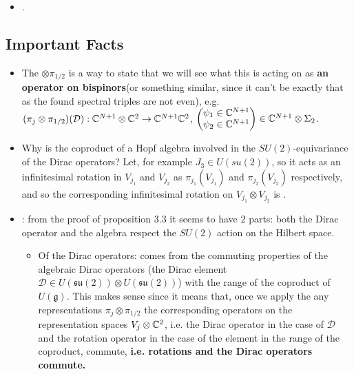 \documentclass{article}
\newcommand{\alg}[1]{\ensuremath{\mathfrak{#1}}}
\newcommand{\sut}{\ensuremath{\mathfrak{su}(2)}}
\begin{document}
\begin{itemize}
\begin{itemize}
        \item {}.
            
        \end{itemize}
    
    
    \end{itemize}

\subsection{Important Facts}

    \begin{itemize}

    \item The $\otimes \pi_{1/2}$ is a way to state that we will see what this is acting on as \textbf{an operator on bispinors}(or something similar, since it can't be exactly that as the found spectral triples are not even), e.g. $(\pi_j \otimes \pi_{1/2})(\mathcal D): \mathbb{C}^{N+1}\otimes \mathbb{C}^2 \to \mathbb{C}^{N+1}\mathbb{C}^2$, $\begin{pmatrix} \psi_1 \in \mathbb{C}^{N+1} \\ \psi_2 \in \mathbb{C}^{N+1} \end{pmatrix} \in \mathbb{C}^{N+1}\otimes \Sigma_2$.
    
    \item Why is the coproduct of a Hopf algebra involved in the $SU(2)$-equivariance of the Dirac operators? Let, for example $J_3 \in U(su(2))$, so it acts as an infinitesimal rotation in $V_{j_1}$ and $V_{j_2}$ as $\pi_{j_1}(V_{j_1})$ and $\pi_{j_2}(V_{j_2})$ respectively, and so the corresponding infinitesimal rotation on $V_{j_1}\otimes V_{j_2}$ is .
    
    \item {}: from the proof of proposition 3.3 it seems to have $2$ parts: both the Dirac operator and the algebra respect the $SU(2)$ action on the Hilbert space.
    
        \begin{itemize}
            
        \item Of the Dirac operators: comes from the commuting properties of the algebraic Dirac operators (the Dirac element $\mathcal D \in U(\sut) \otimes U(\sut)$) with the range of the coproduct of $U(\alg g)$. This makes sense since it means that, once we apply the any representations $\pi_j \otimes \pi_{1/2}$ the corresponding operators on the representation spaces $V_j \otimes \mathbb{C}^2$, i.e. the Dirac operator in the case of $\mathcal D$ and the rotation operator in the case of the element in the range of the coproduct, commute, \textbf{i.e. rotations and the Dirac operators commute.}
            

\end{itemize}
\end{itemize}
\end{document}
